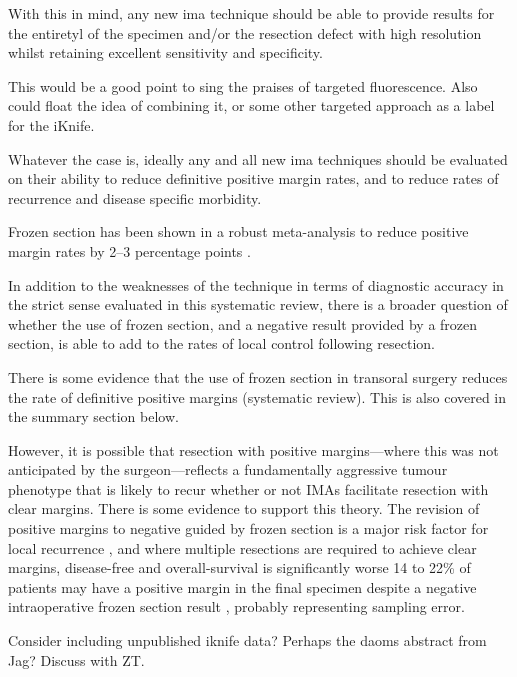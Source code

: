 With this in mind, any new \gls{ima} technique should be able to provide results for the entiretyl of the specimen and/or the resection defect with high resolution whilst retaining excellent sensitivity and specificity.

This would be a good point to sing the praises of targeted fluorescence.
Also could float the idea of combining it, or some other targeted approach as a label for the iKnife.


Whatever the case is, ideally any and all new \gls{ima} techniques should be evaluated on their ability to reduce definitive positive margin rates, and to reduce rates of recurrence and disease specific morbidity.

Frozen section has been shown in a robust meta-analysis to reduce positive margin rates by 2--3 percentage points \cite{gorpheSystematicReviewMetaanalysis2019}.

In addition to the weaknesses of the technique in terms of diagnostic accuracy in the strict sense evaluated in this systematic review, there is a broader question of whether the use of frozen section, and a negative result provided by a frozen section, is able to add to the rates of local control following resection.

There is some evidence that the use of frozen section in transoral surgery reduces the rate of definitive positive margins (systematic review)\cite{gorpheSystematicReviewMetaanalysis2019}. This is also covered in the summary section below.

However, it is possible that resection with positive margins---where this was not anticipated by the surgeon---reflects a fundamentally aggressive tumour phenotype that is likely to recur whether or not IMAs facilitate resection with clear margins.
There is some evidence to support this theory.
The revision of positive margins to negative guided by frozen section is a major risk factor for local recurrence \cite{ettlt.PositiveFrozenSection2016}, and where multiple resections are required to achieve clear margins, disease-free and overall-survival is significantly worse \cite{mooreTransoralRoboticSurgery2018}
14 to 22\% of patients may have a positive margin in the final specimen despite a negative intraoperative frozen section result \cite{ordAccuracyFrozenSections1997, due.RefiningUtilityRole2016}, probably representing sampling error.

Consider including unpublished iknife data? Perhaps the daoms abstract from Jag? Discuss with ZT.

